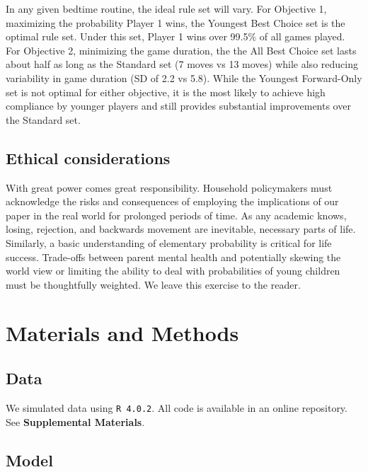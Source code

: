 \documentclass[letterpaper,9pt,twocolumn,twoside,]{pinp}
\begin{document}
In any given bedtime routine, the ideal rule set will vary. For
Objective 1, maximizing the probability Player 1 wins, the Youngest Best
Choice set is the optimal rule set. Under this set, Player 1 wins over
99.5\% of all games played. For Objective 2, minimizing the game
duration, the the All Best Choice set lasts about half as long as the
Standard set (7 moves vs 13 moves) while also reducing variability in
game duration (SD of 2.2 vs 5.8). While the Youngest Forward-Only set is
not optimal for either objective, it is the most likely to achieve high
compliance by younger players and still provides substantial
improvements over the Standard set.

\hypertarget{ethical-considerations}{%
\subsection{Ethical considerations}\label{ethical-considerations}}

With great power comes great responsibility. Household policymakers must
acknowledge the risks and consequences of employing the implications of
our paper in the real world for prolonged periods of time. As any
academic knows, losing, rejection, and backwards movement are
inevitable, necessary parts of life. Similarly, a basic understanding of
elementary probability is critical for life success. Trade-offs between
parent mental health and potentially skewing the world view or limiting
the ability to deal with probabilities of young children must be
thoughtfully weighted. We leave this exercise to the reader.

\hypertarget{materials-and-methods}{%
\section{Materials and Methods}\label{materials-and-methods}}

\hypertarget{data}{%
\subsection{Data}\label{data}}

We simulated data using \texttt{R\ 4.0.2}. All code is available in an
online repository. See \textbf{Supplemental Materials}.

\hypertarget{model}{%
\subsection{Model}\label{model}}
\end{document}

